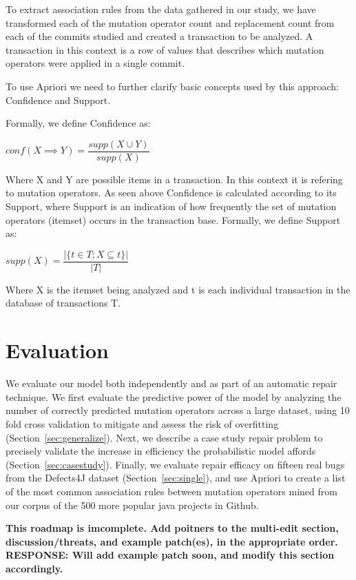 \documentclass[conference]{IEEEtran}
\newcommand{\todo}[1]
  {{\scriptsize \textbf{\color{red} {#1}}}}
\begin{document}
To extract association rules from the data gathered in our study, we 
have transformed each of the mutation operator count and replacement count from 
each of the commits studied and created a transaction to be analyzed. A transaction in this context is a row of values that describes which mutation operators were applied in a single commit.

To use Apriori we need to further clarify basic concepts used by this approach: Confidence and Support.

Formally, we define Confidence as:

\begin{center}
$conf(X \implies Y) = \dfrac{supp(X \cup Y)}{supp(X)}$ 
\end{center}

Where X and Y are possible items in a transaction. In this context it is refering to mutation operators. As seen above Confidence is calculated according to its Support, where Support is an indication of how frequently the set of mutation operators (itemset) occurs in the transaction base.
Formally, we define Support as:

\begin{center}
$supp(X) = \dfrac{|\{t \in T; X \subseteq t\}|}{|T|}$
\end{center}

Where X is the itemset being analyzed and t is each individual transaction in the database of transactions T. 

\section{Evaluation} \label{evaluation}

We evaluate our model both independently and as part of an automatic repair
technique.  We first evaluate the predictive power of the model by analyzing the
number of correctly predicted mutation operators across a large dataset, using 10 fold cross
validation to mitigate and assess the risk of overfitting
(Section~\ref{sec:generalize}).  Next, we describe a case study 
repair problem to precisely validate the increase in efficiency the
probabilistic model affords (Section~\ref{sec:casestudy}).  Finally, we evaluate
repair efficacy on fifteen real bugs from the Defects4J dataset
(Section~\ref{sec:single}), and use Apriori to create a list of the most common association rules between mutation operators mined from our corpus of the 500 more popular java projects in Github.  

\todo{This roadmap is imcomplete.  Add poitners to
  the multi-edit section, discussion/threats, and example patch(es), in the
  appropriate order. RESPONSE: Will add example patch soon, and modify this section accordingly.}
\end{document}
